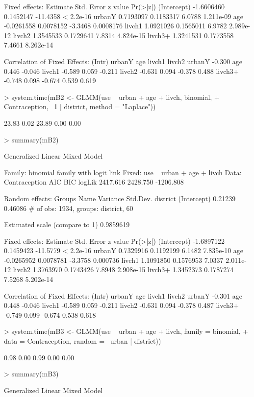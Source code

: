 \documentclass[12pt]{article}
\begin{document}
\begin{Schunk}
\begin{Soutput}
Fixed effects:
              Estimate Std. Error  z value  Pr(>|z|)
(Intercept) -1.6606460  0.1452147 -11.4358 < 2.2e-16
urbanY       0.7193097  0.1183317   6.0788 1.211e-09
age         -0.0261558  0.0078152  -3.3468 0.0008176
livch1       1.0921026  0.1565011   6.9782 2.989e-12
livch2       1.3545533  0.1729641   7.8314 4.824e-15
livch3+      1.3241531  0.1773558   7.4661 8.262e-14

Correlation of Fixed Effects:
        (Intr) urbanY age    livch1 livch2
urbanY  -0.300                            
age      0.446 -0.046                     
livch1  -0.589  0.059 -0.211              
livch2  -0.631  0.094 -0.378  0.488       
livch3+ -0.748  0.098 -0.674  0.539  0.619
\end{Soutput}
\begin{Sinput}
> system.time(mB2 <- GLMM(use ~ urban + age + livch, binomial, 
+     Contraception, ~1 | district, method = "Laplace"))
\end{Sinput}
\begin{Soutput}
[1] 23.83  0.02 23.89  0.00  0.00
\end{Soutput}
\begin{Sinput}
> summary(mB2)
\end{Sinput}
\begin{Soutput}
Generalized Linear Mixed Model

Family: binomial family with logit link
Fixed: use ~ urban + age + livch 
Data: Contraception 
      AIC      BIC    logLik
 2417.616 2428.750 -1206.808

Random effects:
     Groups        Name    Variance    Std.Dev. 
   district (Intercept)     0.21239     0.46086 
# of obs: 1934, groups: district, 60

Estimated scale (compare to 1)  0.9859619 

Fixed effects:
              Estimate Std. Error  z value  Pr(>|z|)
(Intercept) -1.6897122  0.1459423 -11.5779 < 2.2e-16
urbanY       0.7329916  0.1192199   6.1482 7.835e-10
age         -0.0265952  0.0078781  -3.3758  0.000736
livch1       1.1091850  0.1576953   7.0337 2.011e-12
livch2       1.3763970  0.1743426   7.8948 2.908e-15
livch3+      1.3452373  0.1787274   7.5268 5.202e-14

Correlation of Fixed Effects:
        (Intr) urbanY age    livch1 livch2
urbanY  -0.301                            
age      0.448 -0.046                     
livch1  -0.589  0.059 -0.211              
livch2  -0.631  0.094 -0.378  0.487       
livch3+ -0.749  0.099 -0.674  0.538  0.618
\end{Soutput}
\begin{Sinput}
> system.time(mB3 <- GLMM(use ~ urban + age + livch, family = binomial, 
+     data = Contraception, random = ~urban | district))
\end{Sinput}
\begin{Soutput}
[1] 0.98 0.00 0.99 0.00 0.00
\end{Soutput}
\begin{Sinput}
> summary(mB3)
\end{Sinput}
\begin{Soutput}
Generalized Linear Mixed Model


\end{Soutput}
\end{Schunk}
\end{document}
